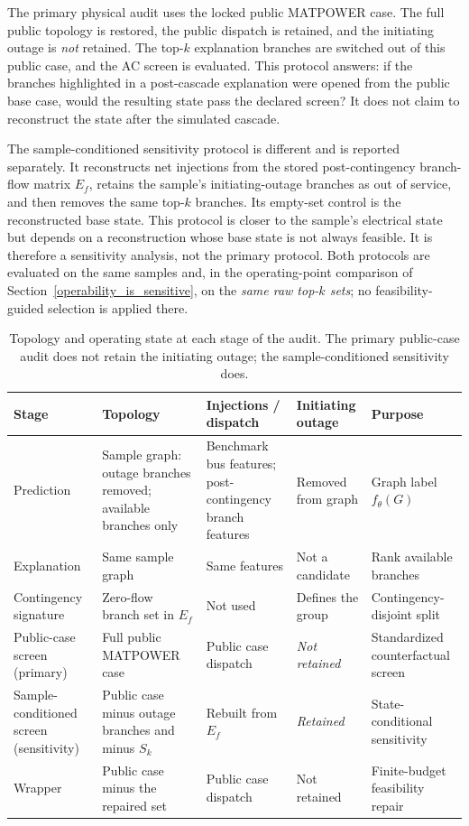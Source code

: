 The primary physical audit uses the locked public MATPOWER case. The full public topology is restored, the public dispatch is retained, and the initiating outage is \emph{not} retained. The top-$k$ explanation branches are switched out of this public case, and the AC screen is evaluated. This protocol answers: if the branches highlighted in a post-cascade explanation were opened from the public base case, would the resulting state pass the declared screen? It does not claim to reconstruct the state after the simulated cascade.

The sample-conditioned sensitivity protocol is different and is reported separately. It reconstructs net injections from the stored post-contingency branch-flow matrix $E_f$, retains the sample's initiating-outage branches as out of service, and then removes the same top-$k$ branches. Its empty-set control is the reconstructed base state. This protocol is closer to the sample's electrical state but depends on a reconstruction whose base state is not always feasible. It is therefore a sensitivity analysis, not the primary protocol. Both protocols are evaluated on the same samples and, in the operating-point comparison of Section~\ref{operability_is_sensitive}, on the \emph{same raw top-$k$ sets}; no feasibility-guided selection is applied there.

\begin{table}[!htbp]
\centering
\caption{Topology and operating state at each stage of the audit. The primary public-case audit does not retain the initiating outage; the sample-conditioned sensitivity does.}
\label{tab:states}
\begingroup{}
\scriptsize
\setlength{\tabcolsep}{3pt}
\begin{tabularx}{\textwidth}{@{}l>{\raggedright\arraybackslash\hsize=1.1\hsize}X>{\raggedright\arraybackslash\hsize=1.0\hsize}X>{\raggedright\arraybackslash\hsize=0.8\hsize}X>{\raggedright\arraybackslash\hsize=1.1\hsize}X@{}}
\toprule
Stage & Topology & Injections / dispatch & Initiating outage & Purpose \\
\midrule
Prediction & Sample graph: outage branches removed; available branches only & Benchmark bus features; post-contingency branch features & Removed from graph & Graph label $f_\theta(G)$ \\
Explanation & Same sample graph & Same features & Not a candidate & Rank available branches \\
Contingency signature & Zero-flow branch set in $E_f$ & Not used & Defines the group & Contingency-disjoint split \\
Public-case screen (primary) & Full public MATPOWER case & Public case dispatch & \emph{Not retained} & Standardized counterfactual screen \\
Sample-conditioned screen (sensitivity) & Public case minus outage branches and minus $S_k$ & Rebuilt from $E_f$ & \emph{Retained} & State-conditional sensitivity \\
Wrapper & Public case minus the repaired set & Public case dispatch & Not retained & Finite-budget feasibility repair \\
\bottomrule
\end{tabularx}
\endgroup
\end{table}

